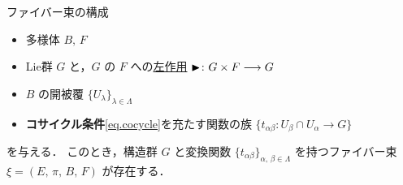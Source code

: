 \documentclass[geometry_main]{subfiles}
\begin{document}
\begin{myprop}[label=prop.cocycle]{ファイバー束の構成}
	\begin{itemize}
        \item \cinfty 多様体 $B,\, F$
        \item Lie群 $G$ と，$G$ の $F$ への\hyperref[def:Lie-action]{左作用} $\blacktriangleright \colon G \times F \longrightarrow G$
        \item $B$ の開被覆 $\{ U_\lambda \}_{\lambda \in \Lambda}$
        \item \textbf{コサイクル条件}\eqref{eq.cocycle}を充たす\cinfty 関数の族 $\{t_{\alpha\beta} \colon U_\beta \cap U_\alpha \to G\}$
    \end{itemize}
    を与える．
    このとき，構造群 $G$ と変換関数 $\{t_{\alpha\beta}\}_{\alpha,\, \beta \in \Lambda}$ を持つファイバー束 $\xi = (E,\, \pi,\, B,\, F)$ が存在する．
\end{myprop}
\end{document}
